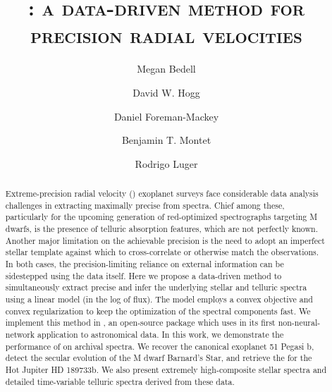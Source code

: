 \documentclass[modern]{aastex62}
\newcommand{\Mdwarf}{Barnard's Star\xspace} %
\begin{document}
\sloppy\sloppypar\raggedbottom\frenchspacing %

\shorttitle{\wobble}

\graphicspath{ {figures/} }

\title{\textsc{\wobble: a data-driven method for precision radial velocities}}

\author[0000-0001-9907-7742]{Megan Bedell}
\affiliation{\flatiron}

\author[0000-0003-2866-9403]{David W. Hogg}
\affiliation{\flatiron}

\author[0000-0002-9328-5652]{Daniel Foreman-Mackey}
\affiliation{\flatiron}

\author[0000-0001-7516-8308]{Benjamin T. Montet}
\affiliation{\chicago}

\author[0000-0002-0296-3826]{Rodrigo Luger}
\affiliation{\flatiron}


\begin{abstract}
Extreme-precision radial velocity (\EPRV) exoplanet surveys face considerable data analysis challenges in extracting maximally precise \RVs from spectra.
Chief among these, particularly for the upcoming generation of red-optimized spectrographs targeting M dwarfs, is the presence of telluric absorption features, which are not perfectly known.
Another major limitation on the achievable \RV precision is the need to adopt an imperfect stellar template against which to cross-correlate or otherwise match the observations.
In both cases, the precision-limiting reliance on external information can be sidestepped using the data itself.
Here we propose a data-driven method to simultaneously extract precise \RVs and infer the underlying stellar and telluric spectra using a linear model (in the log of flux).
The model employs a convex objective and convex regularization to keep the optimization of the spectral components fast.
We implement this method in \wobble, an open-source \python package which uses \TF in its first non-neural-network application to astronomical data.
In this work, we demonstrate the performance of \wobble on archival \HARPS spectra.
We recover the canonical exoplanet 51 Pegasi b, detect the secular \RV evolution of the M dwarf \Mdwarf, and retrieve the \RM for the Hot Jupiter HD 189733b.
We also present extremely high-\SNR composite stellar spectra and detailed time-variable telluric spectra derived from these data.
\end{abstract}
\end{document}
